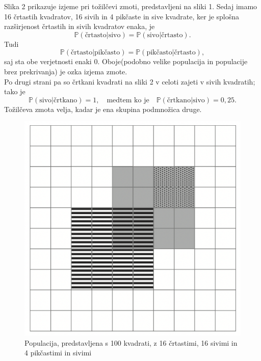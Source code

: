 \documentclass[a4paper,12pt]{article}
\begin{document}
 Slika 2 prikazuje izjeme pri tožilčevi zmoti, predstavljeni na sliki 1. Sedaj imamo 16 črtastih kvadratov, 16 sivih in 4 pikčaste in sive kvadrate, ker je splošna 
 razširjenost črtastih in sivih kvadratov enaka, je
 \[ \mathbb{P}(\text{črtasto} \lvert \text{sivo}) = \mathbb{P}(\text{sivo} \lvert \text{črtasto}).\]
Tudi 
\[\mathbb{P}(\text{črtasto} \lvert \text{pikčasto}) = \mathbb{P}(\text{pikčasto} \lvert \text{črtasto}),\]
saj sta obe verjetnosti enaki $0$. Oboje(podobno velike populacija in populacije brez prekrivanja) je ozka izjema zmote. \\
Po drugi strani pa so črtkani kvadrati na sliki 2 v celoti zajeti v sivih kvadratih; tako je 
\[\mathbb{P}(\text{sivo} \lvert \text{črtkano}) = 1, \quad \text{medtem ko je} \quad \mathbb{P}(\text{črtkano} \lvert \text{sivo}) = 0,25. \]
Tožilčeva zmota velja, kadar je ena skupina podmnožica druge.

\begin{figure}[!ht]
    \centering
    \label{fig:slika1}
    \includegraphics[scale=0.45]{slika2.png}
    \caption{Populacija, predstavljena s 100 kvadrati, z 16 črtastimi, 16 sivimi in 4 pikčastimi in sivimi}\vspace{2mm}
 \end{figure}
\end{document}
